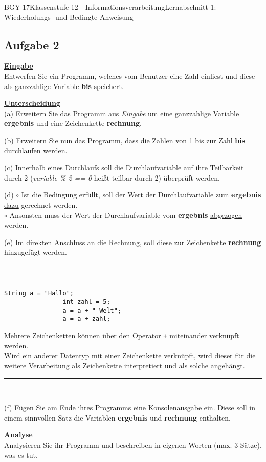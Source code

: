 \documentclass[oneside,openany,headings=optiontotoc,11pt,numbers=noenddot]{scrreprt}
\begin{document}
\begin{worksheet}{BGY 17}{Klassenstufe 12 - Informationsverarbeitung}{Lernabschnitt 1: Wiederholungs- und Bedingte Anweisung}
\begin{framed}
			\section*{Aufgabe 2}
			\textbf{\underline{Eingabe}}\\
			Entwerfen Sie ein Programm, welches vom Benutzer eine Zahl einliest und diese als ganzzahlige Variable \textbf{bis} speichert.
			\par\bigskip\noindent
			\textbf{\underline{Unterscheidung}}\\
			(a) Erweitern Sie das Programm aus \textit{Eingabe} um eine ganzzahlige Variable \textbf{ergebnis} und eine Zeichenkette \textbf{rechnung}.\\
			\par\noindent
			(b) Erweitern Sie nun das Programm, dass die Zahlen von 1 bis zur Zahl \textbf{bis} durchlaufen werden.\\
			\par\noindent
			(c) Innerhalb eines Durchlaufs soll die Durchlaufvariable auf ihre Teilbarkeit durch 2 (\textit{variable \% 2 == 0} heißt teilbar durch 2) überprüft werden.\\
			\par\noindent
			(d) $\circ$ Ist die Bedingung erfüllt, soll der Wert der Durchlaufvariable zum \textbf{ergebnis} \underline{dazu} gerechnet werden.\\
			$\circ$ Ansonsten muss der Wert der Durchlaufvariable vom \textbf{ergebnis} \underline{abgezogen} werden.\\
			\par\noindent
			(e) Im direkten Anschluss an die Rechnung, soll diese zur Zeichenkette \textbf{rechnung} hinzugefügt werden.\\
			\rule{\textwidth}{0.1pt}\\
			\begin{lstlisting}[style=JavaInputStyle]
				String a = "Hallo";
				int zahl = 5;
				a = a + " Welt";
				a = a + zahl;
			\end{lstlisting}
			\small{Mehrere Zeichenketten können über den Operator \lstinline[style=JavaInputStyle]{+} miteinander verknüpft werden.\\
			Wird ein anderer Datentyp mit einer Zeichenkette verknüpft, wird dieser für die weitere Verarbeitung als Zeichenkette interpretiert und als solche angehängt.}\\
			\normalsize
			\rule{\textwidth}{0.1pt}\\
			\par\noindent
			(f) Fügen Sie am Ende ihres Programms eine Konsolenausgabe ein. Diese soll in einem sinnvollen Satz die Variablen \textbf{ergebnis} und \textbf{rechnung} enthalten.\\
			\par\bigskip\noindent
			\textbf{\underline{Analyse}}\\
			Analysieren Sie ihr Programm und beschreiben in eigenen Worten (max. 3 Sätze), was es tut.
		\end{framed}
	\end{worksheet}
\end{document}
